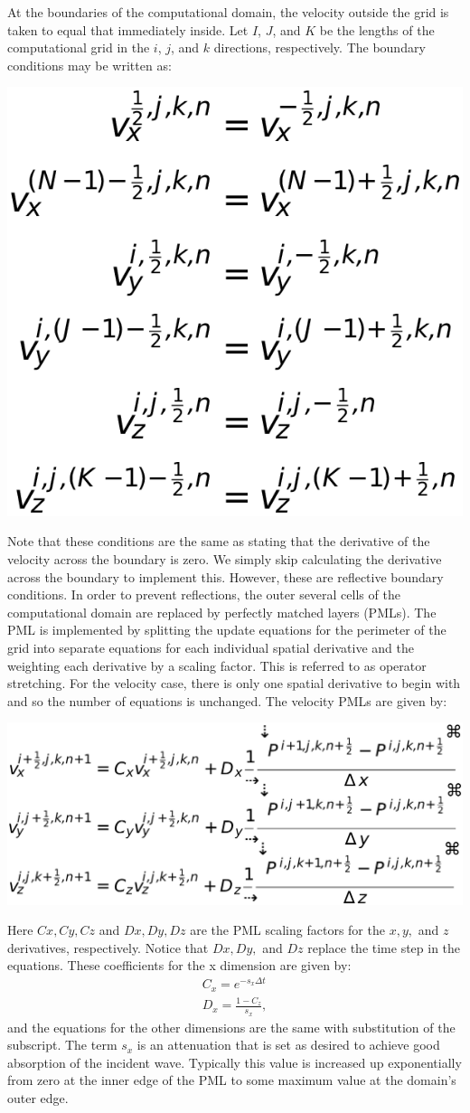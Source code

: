 At the boundaries of the computational domain, the velocity outside the grid is
taken to equal that immediately inside. Let $I$, $J$, and $K$ be the lengths of
the computational grid in the $i$, $j$, and $k$ directions, respectively. The
boundary conditions may be written as: 

\centerline{\includegraphics[width=0.3\linewidth]{steve/figs/image9.png}}

Note that these conditions are the same as stating that the derivative of the
velocity across the boundary is zero. We simply skip calculating the derivative
across the boundary to implement this. However, these are reflective boundary
conditions. In order to prevent reflections, the outer several cells of the
computational domain are replaced by perfectly matched layers (PMLs). The PML
is implemented by splitting the update equations for the perimeter of the grid
into separate equations for each individual spatial derivative and the
weighting each derivative by a scaling factor. This is referred to as operator
stretching. For the velocity case, there is only one spatial derivative to
begin with and so the 
number of equations is unchanged. The velocity PMLs are given by:

\centerline{\includegraphics[width=0.5\linewidth]{steve/figs/image10.png}}

Here $Cx, Cy, Cz$ and $Dx, Dy, Dz$ are the PML scaling factors for the $x, y,$
and $z$ derivatives, respectively. Notice that $Dx, Dy,$ and $Dz$ replace the
time step in the equations. These coefficients for the x dimension are given
by:
\begin{align*}
    C_x = e^{-s_x \Delta t}\\
    D_x = \frac{1-C_z}{s_x},
\end{align*}
and the equations for the other dimensions are the same with substitution of
the subscript. The term $s_x$ is an attenuation that is set as desired to
achieve good absorption of the incident wave. Typically this value is increased up
exponentially from zero at the inner edge of the PML to some maximum value at
the domain’s outer edge.

